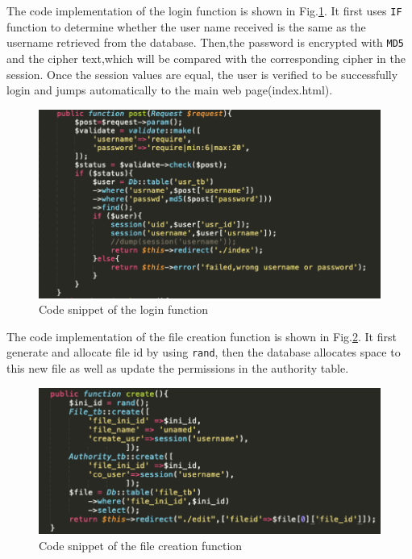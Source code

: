 \noindent The code implementation of the login function is shown in Fig.\ref{png2}. It first uses \texttt{IF} function to determine whether the user name received is the same as the username retrieved from the database. Then,the password is encrypted with \texttt{MD5} and the cipher text,which will be compared with the corresponding cipher in the session. Once the session values are equal, the user is verified to be successfully login and jumps automatically to the main web page(index.html).
\begin{figure}[H]
  \centering
  \includegraphics[width=.8\textwidth]{login.png} %
  \caption{Code snippet of the login function} %
  \label{png2} %
\end{figure}

\noindent The code implementation of the file creation function is shown in Fig.\ref{png3}. It first generate and allocate file id by using \texttt{rand}, then the database allocates space to this new file as well as update the permissions in the authority table.
\begin{figure}[H]
  \centering 
  \includegraphics[width=.8\textwidth]{createfile.png} %
  \caption{Code snippet of the file creation function} %
  \label{png3} %
\end{figure}



